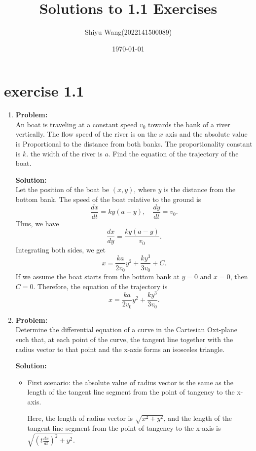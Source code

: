 \documentclass[12pt]{article}
\title{Solutions to 1.1 Exercises}
\author{Shiyu Wang(2022141500089)}
\date{\today}
\begin{document}
\maketitle

\section{exercise 1.1}

\begin{enumerate}[label=\textbf{Exercise \arabic*:}]
    \item
    \textbf{Problem:} \\
    An boat is traveling at a constant speed $v_0$ towards the bank of a river vertically. The flow speed of the river is on the 
    $x$ axis and the absolute value is Proportional to the distance from both banks. The proportionality constant is $k$. 
    the width of the river is $a$. Find the equation of the trajectory of the boat.

    \textbf{Solution:} \\
    Let the position of the boat be $(x,y)$, where $y$ is the distance from the bottom bank. The speed of the boat relative to the ground is
    \[\frac{dx}{dt} = ky(a-y), \quad \frac{dy}{dt} = v_0.\]
    Thus, we have
    \[\frac{dx}{dy} = \frac{ky(a-y)}{v_0}.\]
    Integrating both sides, we get
    \[x = \frac{ka}{2v_0}y^2 +\frac{ky^3}{3v_0} + C.\]
    If we assume the boat starts from the bottom bank at $y=0$ and $x=0$, then $C=0$. Therefore, the equation of the trajectory is
    \[x = \frac{ka}{2v_0}y^2 +\frac{ky^3}{3v_0}.\]

    \item
    \textbf{Problem:} \\
    Determine the differential equation of a curve in the Cartesian Oxt-plane such that,
     at each point of the curve, the tangent line together with the radius vector 
     to that point and the x-axis forms an isosceles triangle.


    \textbf{Solution:} \\
    
    \begin{itemize}
        \item First scenario: the absolute value of radius vector is the same as the length 
        of the tangent line segment from the point of tangency to the x-axis.

        Here, the length of radius vector is $\sqrt{x^2 + y^2}$, and the length of the tangent 
        line segment from the point of tangency to the x-axis is $\sqrt{(t\frac{dx}{dt})^2+y^2}$.


\end{itemize}
\end{enumerate}
\end{document}
